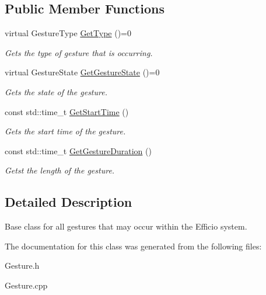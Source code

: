 \subsection*{Public Member Functions}
\begin{DoxyCompactItemize}
\item 
virtual Gesture\+Type \hyperlink{class_efficio_1_1_gesture_a1dceb41c6103f735d6c924e6b326d4ed}{Get\+Type} ()=0\hypertarget{class_efficio_1_1_gesture_a1dceb41c6103f735d6c924e6b326d4ed}{}\label{class_efficio_1_1_gesture_a1dceb41c6103f735d6c924e6b326d4ed}

\begin{DoxyCompactList}\small\item\em Gets the type of gesture that is occurring. \end{DoxyCompactList}\item 
virtual Gesture\+State \hyperlink{class_efficio_1_1_gesture_a5c684cc41877fd93b75e5ddd3e1f0838}{Get\+Gesture\+State} ()=0\hypertarget{class_efficio_1_1_gesture_a5c684cc41877fd93b75e5ddd3e1f0838}{}\label{class_efficio_1_1_gesture_a5c684cc41877fd93b75e5ddd3e1f0838}

\begin{DoxyCompactList}\small\item\em Gets the state of the gesture. \end{DoxyCompactList}\item 
const std\+::time\+\_\+t \hyperlink{class_efficio_1_1_gesture_ad95aeceea04dfd3b6b29e59784bbec5e}{Get\+Start\+Time} ()\hypertarget{class_efficio_1_1_gesture_ad95aeceea04dfd3b6b29e59784bbec5e}{}\label{class_efficio_1_1_gesture_ad95aeceea04dfd3b6b29e59784bbec5e}

\begin{DoxyCompactList}\small\item\em Gets the start time of the gesture. \end{DoxyCompactList}\item 
const std\+::time\+\_\+t \hyperlink{class_efficio_1_1_gesture_a091229f658192fc161e0c99b39fe2f4b}{Get\+Gesture\+Duration} ()\hypertarget{class_efficio_1_1_gesture_a091229f658192fc161e0c99b39fe2f4b}{}\label{class_efficio_1_1_gesture_a091229f658192fc161e0c99b39fe2f4b}

\begin{DoxyCompactList}\small\item\em Getst the length of the gesture. \end{DoxyCompactList}\end{DoxyCompactItemize}


\subsection{Detailed Description}
Base class for all gestures that may occur within the Efficio system. 

The documentation for this class was generated from the following files\+:\begin{DoxyCompactItemize}
\item 
Gesture.\+h\item 
Gesture.\+cpp\end{DoxyCompactItemize}
